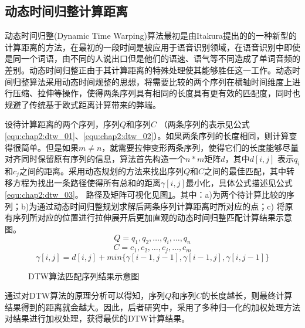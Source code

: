 \subsection{动态时间归整计算距离}
动态时间归整(Dynamic Time Warping)算法最初是由Itakura提出的的一种新型的计算距离的方法，在最初的一段时间是被应用于语音识别领域，在语音识别中即使是同一个词语，由不同的人说出口但是他们的语速、语气等不同造成了单词音频的差别。动态时间归整正由于其计算距离的特殊处理使其能够胜任这一工作。动态时间归整算法采用动态时间规整的思想，将需要比较的两个序列在横轴时间维度上进行压缩、拉伸等操作，使得两条序列具有相同的长度具有更有效的匹配度，同时也规避了传统基于欧式距离计算带来的弊端。
\par 设待计算距离的两个序列，序列$Q$和序列$C$ （两条序列的表示见公式\ref{equ:chap2:dtw_01}、\ref{equ:chap2:dtw_02}）。如果两条序列的长度相同，则计算变得很简单。但是如果$m \neq n$，就需要拉伸变形两条序列，使得它们的长度能够尽量对齐同时保留原有序列的信息，算法首先构造一个$n \ast m$矩阵$d$，其中$d[i,j]$ 表示$q_{i}$ 和$c_{j}$之间的距离。采用动态规划的方法来找出序列$Q$和$C$之间的最佳匹配，其中转移方程为找出一条路径使得所有总和的距离$\gamma[i,j]$最小化，具体公式描述见公式\ref{equ:chap2:dtw_03}。
路径及矩阵可视化见图\ref{fig:2_5}。其中：a)为两个待计算比较的序列；b)为通过动态时间归整规划求解后两条序列计算距离时所对应的点；c) 将原有序列所对应的位置进行拉伸展开后更加直观的动态时间归整匹配计算结果示意图。
\begin{equation}
\label{equ:chap2:dtw_01}
Q=q_{1},q_{2},…,q_{i},…,q_{n}
\end{equation}
\begin{equation}
\label{equ:chap2:dtw_02}
C=c_{1},c_{2},…,c_{j},…,c_{m}
\end{equation}
\begin{equation}
\label{equ:chap2:dtw_03}
\gamma[i,j]=d[i,j]+min\{\gamma[i-1,j-1],\gamma[i-1,j],\gamma[i,j-1]\}
\end{equation}
\begin{figure}[htb]
  \centering%
  \hspace{2em}%
  \hspace{2em}
  \caption{DTW算法匹配序列结果示意图}
  \label{fig:2_5}
\end{figure}
\par 通过对DTW算法的原理分析可以得知，序列$Q$和序列$C$的长度越长，则最终计算结果得到的距离就会越大。因此，后者研究中，采用了多种归一化的加权处理方法对结果进行加权处理\cite{ratanamahatana2004everything}，获得最优的DTW计算结果。


